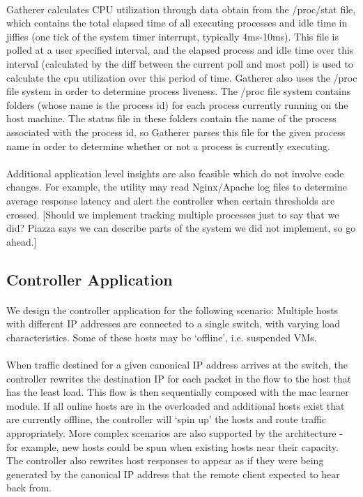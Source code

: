 \documentclass[10pt]{article}
\begin{document}
\paragraph{} Gatherer calculates CPU utilization through data obtain from the /proc/stat file, which contains the total elapsed time of all executing processes and idle time in jiffies (one tick of the system timer interrupt, typically 4ms-10ms). This file is polled at a user specified interval, and the elapsed process and idle time over this interval (calculated by the diff between the current poll and most poll) is used to calculate the cpu utilization over this period of time. Gatherer also uses the /proc file system in order to determine process liveness. The /proc file system contains folders (whose name is the process id) for each process currently running on the host machine. The status file in these folders contain the name of the process associated with the process id, so Gatherer parses this file for the given process name in order to determine whether or not a process is currently executing.

\paragraph{} Additional application level insights are also feasible which do not involve code changes. For example, the utility may read Nginx/Apache log files to determine average response latency and alert the controller when certain thresholds are crossed.
[Should we implement tracking multiple processes just to say that we did? Piazza says we can describe parts of the system we did not implement, so go ahead.]

\subsection{Controller Application}

\paragraph{} We design the controller application for the following scenario: Multiple hosts with different IP addresses are connected to a single switch, with varying load characteristics. Some of these hosts may be ‘offline’, i.e. suspended VMs.

\paragraph{} When traffic destined for a given canonical IP address arrives at the switch, the controller rewrites the destination IP for each packet in the flow to the host that has the least load. This flow is then sequentially composed with the mac learner module. If all online hosts are in the overloaded and additional hosts exist that are currently offline, the controller will ‘spin up’ the hosts and route traffic appropriately. More complex scenarios are also supported by the architecture - for example, new hosts could be spun when existing hosts near their capacity. The controller also rewrites host responses to appear as if they were being generated by the canonical IP address that the remote client expected to hear back from.
\end{document}
